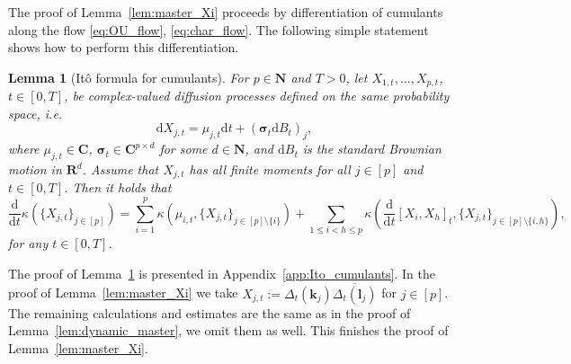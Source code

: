 \documentclass[10pt]{amsart}
\newtheorem{lemma}[theorem]{Lemma}
\numberwithin{equation}{section}
\newcommand{\nc}{\normalcolor}
\newcommand{\dif}{\mathrm{d}}
\newcommand{\R}{\mathbf{R}}
\newcommand{\C}{\mathbf{C}}
\newcommand{\N}{\mathbf{N}}
\begin{document}
The proof of Lemma~\ref{lem:master_Xi} proceeds by differentiation of cumulants along the flow \eqref{eq:OU_flow}, \eqref{eq:char_flow}.
The following simple statement shows how to perform this differentiation.

\begin{lemma}[It\^{o} formula for cumulants]\label{lem:Ito_cumulants} For $p\in\N$ and $T>0$, let $X_{1,t},\ldots,X_{p,t}$, $t\in[0,T]$, be complex-valued diffusion processes defined on the same probability space, i.e.
\begin{equation}
\dif X_{j,t}=\mu_{j,t}\dif t + (\bm{\sigma}_t\dif B_t)_j,
\end{equation}
where $\mu_{j,t}\in\C$, $\bm{\sigma}_t\in\C^{p\times d}$ for some $d\in\N$, and $\dif B_t$ is the standard Brownian motion in $\R^d$. Assume that $X_{j,t}$ has all finite moments for all $j\in[p]$ and $t\in [0,T]$. Then it holds that
\begin{equation}
\frac{\dif}{\dif t}\kappa\left(\lbrace X_{j,t}\rbrace_{j\in[p]}\right) = \sum_{i=1}^p \kappa\left(\mu_{i,t},\lbrace X_{j,t}\rbrace_{j\in[p]\setminus\{i\}}\right) + \sum_{1\le i<h\le p}\kappa\left(\frac{\dif}{\dif t}[X_i,X_h]_t,\lbrace X_{j,t}\rbrace_{j\in[p]\setminus\{i,h\}}\right), 
\label{eq:Ito_cumulants}
\end{equation} 
for any $t\in [0,T]$. 
\end{lemma}

The proof of Lemma~\ref{lem:Ito_cumulants} is presented in Appendix~\ref{app:Ito_cumulants}. In the proof of Lemma~\ref{lem:master_Xi} we take $X_{j,t}:=\Delta_t(\bm{k}_j)\overline{\Delta_t(\bm{l}_j)}$ for $j\in[p]$. The remaining calculations and estimates are the same as in the proof of Lemma~\ref{lem:dynamic_master}, we omit them as well.  This finishes the proof of Lemma~\ref{lem:master_Xi}.\nc

\smallskip
\end{document}
